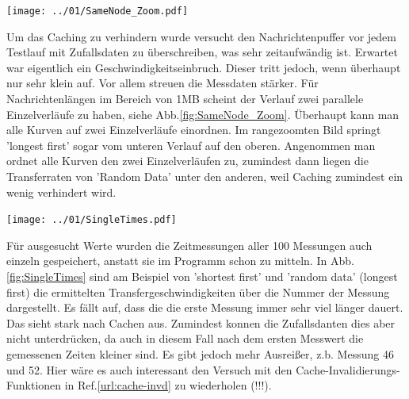 \documentclass[12pt,a4paper]{article}
\begin{document}
\begin{center}
	\centering
	\captionsetup{type=figure}
	\begin{minipage}{0.6\linewidth}
		\texttt{[image: ../01/SameNode\_Zoom.pdf]}
	\end{minipage}
	\label{fig:SameNode_Zoom}
\end{center}

Um das Caching zu verhindern wurde versucht den Nachrichtenpuffer vor jedem Testlauf mit Zufallsdaten zu überschreiben, was sehr zeitaufwändig ist. Erwartet war eigentlich ein Geschwindigkeitseinbruch. Dieser tritt jedoch, wenn überhaupt nur sehr klein auf. Vor allem streuen die Messdaten stärker. Für Nachrichtenlängen im Bereich von 1MB scheint der Verlauf zwei parallele Einzelverläufe zu haben, siehe Abb.\ref{fig:SameNode_Zoom}. Überhaupt kann man alle Kurven auf zwei Einzelverläufe einordnen. Im rangezoomten Bild springt 'longest first' sogar vom unteren Verlauf auf den oberen. Angenommen man ordnet alle Kurven den zwei Einzelverläufen zu, zumindest dann liegen die Transferraten von 'Random Data' unter den anderen, weil Caching zumindest ein wenig verhindert wird.\\

\begin{center}
	\centering
	\captionsetup{type=figure}
	\begin{minipage}{\linewidth}
		\texttt{[image: ../01/SingleTimes.pdf]}
	\end{minipage}
	\label{fig:SingleTimes}
\end{center}

Für ausgesucht Werte wurden die Zeitmessungen aller 100 Messungen auch einzeln gespeichert, anstatt sie im Programm schon zu mitteln. In Abb.\ref{fig:SingleTimes} sind am Beispiel von 'shortest first' und 'random data' (longest first) die ermittelten Transfergeschwindigkeiten über die Nummer der Messung dargestellt. Es fällt auf, dass die die erste Messung immer sehr viel länger dauert. Das sieht stark nach Cachen aus. Zumindest konnen die Zufallsdanten dies aber nicht unterdrücken, da auch in diesem Fall nach dem ersten Messwert die gemessenen Zeiten kleiner sind. Es gibt jedoch mehr Ausreißer, z.b. Messung 46 und 52. Hier wäre es auch interessant den Versuch mit den Cache-Invalidierungs-Funktionen in Ref.\ref{url:cache-invd} zu wiederholen (!!!).\\
\end{document}
